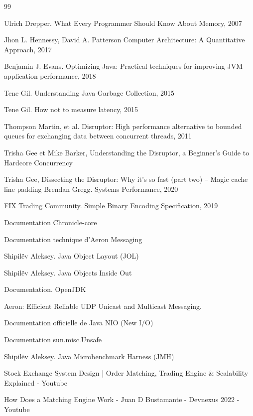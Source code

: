 \renewcommand{\refname}{Bibliography}

\begin{thebibliography}{99}

Ulrich Drepper. What Every Programmer Should Know About Memory, 2007

Jhon L. Hennessy, David A. Patterson Computer Architecture: A Quantitative Approach, 2017


Benjamin J. Evans. Optimizing Java: Practical techniques for improving JVM application performance, 2018

Tene Gil. Understanding Java Garbage Collection, 2015

Tene Gil. How not to measure latency, 2015

Thompson Martin, et al. Disruptor: High performance alternative to bounded queues for exchanging data between concurrent threads, 2011

Trisha Gee et Mike Barker, Understanding the Disruptor, a Beginner's Guide to Hardcore Concurrency

Trisha Gee, Dissecting the Disruptor: Why it’s so fast (part two) – Magic cache line padding
Brendan Gregg. Systems Performance, 2020

FIX Trading Community. Simple Binary Encoding Specification, 2019

Documentation Chronicle-core

Documentation technique d'Aeron Messaging

Shipilëv Aleksey. Java Object Layout (JOL)

Shipilëv Aleksey. Java Objects Inside Out

Documentation. OpenJDK

Aeron: Efficient Reliable UDP Unicast and Multicast Messaging.

Documentation officielle de Java NIO (New I/O)

Documentation sun.misc.Unsafe

Shipilëv Aleksey. Java Microbenchmark Harness (JMH)

Stock Exchange System Design | Order Matching, Trading Engine \& Scalability Explained - Youtube

How Does a Matching Engine Work - Juan D Bustamante - Devnexus 2022 - Youtube
\end{thebibliography}